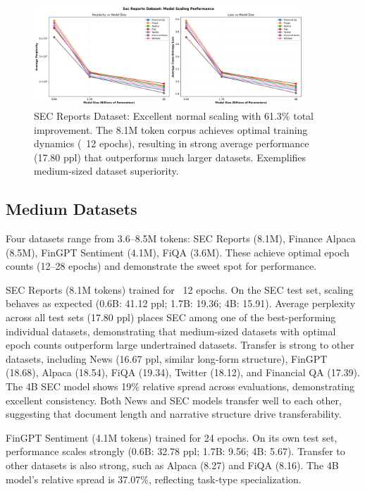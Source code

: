 \begin{figure}[htbp]
\centering
\includegraphics[width=0.9\textwidth]{figures/scaling_sec_reports.png}
\caption[SEC Reports Dataset: Scaling Behavior]{SEC Reports Dataset: Excellent normal scaling with 61.3\% total improvement. The 8.1M token corpus achieves optimal training dynamics (~12 epochs), resulting in strong average performance (17.80 ppl) that outperforms much larger datasets. Exemplifies medium-sized dataset superiority.}
\label{fig:scaling_sec_reports}
\end{figure}





\subsection{Medium Datasets}

Four datasets range from 3.6–8.5M tokens: SEC Reports (8.1M), Finance Alpaca (8.5M), FinGPT Sentiment (4.1M), FiQA (3.6M). These achieve optimal epoch counts (12–28 epochs) and demonstrate the sweet spot for performance.

SEC Reports (8.1M tokens) trained for ~12 epochs. On the SEC test set, scaling behaves as expected (0.6B: 41.12 ppl; 1.7B: 19.36; 4B: 15.91). Average perplexity across all test sets (17.80 ppl) places SEC among one of the best-performing individual datasets, demonstrating that medium-sized datasets with optimal epoch counts outperform large undertrained datasets. Transfer is strong to other datasets, including News (16.67 ppl, similar long‑form structure), FinGPT (18.68), Alpaca (18.54), FiQA (19.34), Twitter (18.12), and Financial QA (17.39). The 4B SEC model shows 19\% relative spread across evaluations, demonstrating excellent consistency. Both News and SEC models transfer well to each other, suggesting that document length and narrative structure drive transferability.

FinGPT Sentiment (4.1M tokens) trained for 24 epochs. On its own test set, performance scales strongly (0.6B: 32.78 ppl; 1.7B: 9.56; 4B: 5.67). Transfer to other datasets is also strong, such as Alpaca (8.27) and FiQA (8.16). The 4B model's relative spread is 37.07\%, reflecting task‑type specialization.

